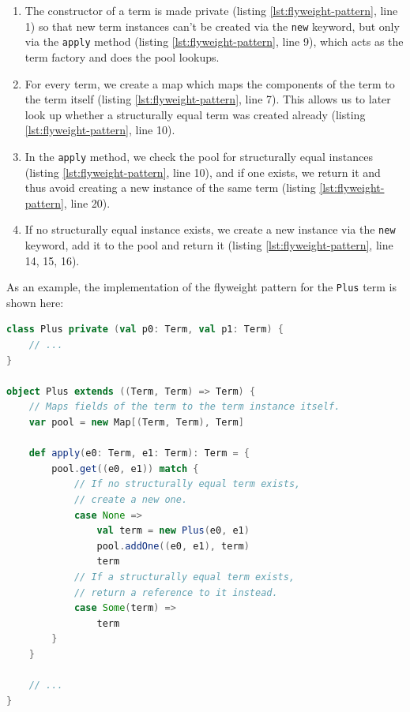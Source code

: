 \documentclass[11pt]{article}
\begin{document}
    \begin{enumerate}
        \item The constructor of a term is made private (listing \ref{lst:flyweight-pattern}, line 1) so that new term instances can't be created via
            the \texttt{new} keyword, but only via the \texttt{apply} method (listing \ref{lst:flyweight-pattern}, line 9), which acts as the
            term factory and does the pool lookups.
        \item For every term, we create a map which maps the components of the term to the term itself (listing \ref{lst:flyweight-pattern}, line 7).
            This allows us to later look up whether a structurally equal term was created already (listing \ref{lst:flyweight-pattern}, line 10).
        \item In the \texttt{apply} method, we check the pool for structurally equal instances (listing \ref{lst:flyweight-pattern}, line 10),
            and if one exists, we return it and thus avoid creating a new instance of the
            same term (listing \ref{lst:flyweight-pattern}, line 20).
        \item If no structurally equal instance exists, we create a new instance via the \texttt{new}
            keyword, add it to the pool and return it (listing \ref{lst:flyweight-pattern}, line 14, 15, 16).
    \end{enumerate}

    As an example, the implementation of the flyweight pattern for the \texttt{Plus} term is shown here:

    \begin{lstlisting}[language=Scala, caption={Implementation of the flyweight pattern.}, label={lst:flyweight-pattern}]
class Plus private (val p0: Term, val p1: Term) {
    // ...
}

object Plus extends ((Term, Term) => Term) {
    // Maps fields of the term to the term instance itself.
    var pool = new Map[(Term, Term), Term]

    def apply(e0: Term, e1: Term): Term = {
        pool.get((e0, e1)) match {
            // If no structurally equal term exists,
            // create a new one.
            case None => 
                val term = new Plus(e0, e1)
                pool.addOne((e0, e1), term)
                term
            // If a structurally equal term exists,
            // return a reference to it instead.
            case Some(term) => 
                term
        }
    }

    // ...
}       
    \end{lstlisting}
\end{document}
